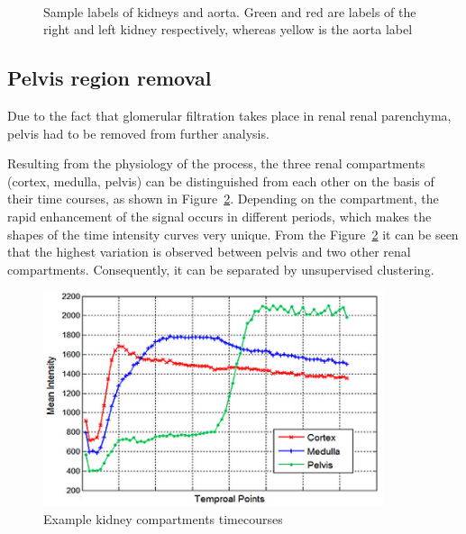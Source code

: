 \begin{figure}
\captionsetup[subfloat]{captionskip=0.5cm}
	\centering
	\hspace{0.02\textwidth}
	\\	
\vspace{0.5cm}
\caption[Sample labels of kidneys and aorta]{Sample labels of kidneys and aorta. Green and red are labels of the right and left kidney respectively, whereas yellow is the aorta label}
\label{fig:labels}
\end{figure}

\subsection{Pelvis region removal}
Due to the fact that glomerular filtration takes place in renal renal parenchyma, pelvis had to be removed from further analysis. 

Resulting from the physiology of the process, the three renal compartments (cortex, medulla, pelvis) can be distinguished from each other on the basis of their time courses, as shown in Figure~\ref{fig:timecourses}. Depending on the compartment, the rapid enhancement of the signal occurs in different periods, which makes the shapes of the time intensity curves very unique.
From the Figure~\ref{fig:timecourses} it can be seen that the highest variation is observed between pelvis and two other renal compartments.
Consequently, it can be separated by unsupervised clustering.


\begin{figure}
	\centering
	\includegraphics[width=10cm]{img/timecourses}
	\caption[Example kidney compartments timecourses]{Example kidney compartments timecourses \cite{KidneySubsegmentation}}
	\label{fig:timecourses}
\end{figure}


